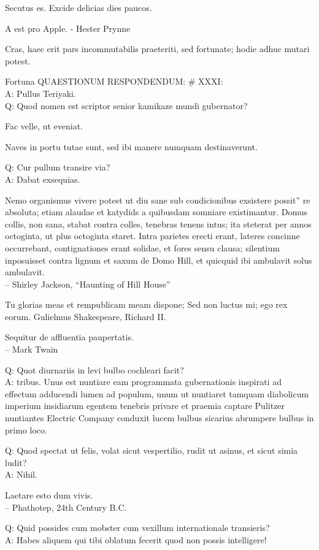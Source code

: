 \documentclass[titlepage,12pt]{memoir}
\begin{document}
Secutus es. Excide delicias dies paucos.

A est pro Apple. - Hester Prynne

Cras, haec erit pars incommutabilis praeteriti, sed fortunate;
hodie adhuc mutari potest.

Fortuna QUAESTIONUM RESPONDENDUM: \# XXXI:\\
A: Pullus Teriyaki.
\\Q: Quod nomen est scriptor senior kamikaze mundi gubernator?

Fac velle, ut eveniat.

Naves in portu tutae sunt, sed ibi manere numquam destinaverunt.

Q: Cur pullum transire via?\\
A: Dabat exsequias.

Nemo organismus vivere potest ut diu sane sub condicionibus exsistere possit”
re absoluta; etiam alaudae et katydids a quibusdam somniare existimantur.
Domus collis, non sana, stabat contra colles, tenebras tenens
intus; ita steterat per annos octoginta, ut plus octoginta staret.
Intra parietes erecti erant, lateres concinne occurrebant, contignationes erant solidae, et
fores sensu clausa; silentium inposuisset contra lignum et saxum
de Domo Hill, et quicquid ibi ambulavit solus ambulavit.
\\-- Shirley Jackson, “Haunting of Hill House”

Tu glorias meas et rempublicam meam dispone;
Sed non luctus mi; ego rex eorum.
Gulielmus Shakespeare, Richard II.

Sequitur de affluentia paupertatis.
\\-- Mark Twain

Q: Quot diurnariis in levi bulbo cochleari facit?\\
A: tribus. Unus est nuntiare eam programmata gubernationis inspirati ad effectum adducendi
lumen ad populum, unum ut nuntiaret tamquam diabolicum imperium insidiarum
egentem tenebris privare et praemia captare Pulitzer
nuntiantes Electric Company conduxit lucem bulbus sicarius abrumpere
bulbus in primo loco.

Q: Quod spectat ut felis, volat sicut vespertilio, rudit ut asinus, et
sicut simia ludit?\\
A: Nihil.

Laetare esto dum vivis.
\\-- Phathotep, 24th Century B.C.

Q: Quid possides cum mobster cum vexillum internationale transieris?\\
A: Habes aliquem qui tibi oblatum fecerit quod non possis intelligere!
\end{document}
